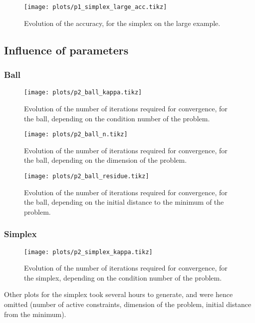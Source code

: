 \documentclass[final]{aomart}
\newtheorem[{}\it]{thm}{Theorem}[section]
\theoremstyle{definition}
\newtheorem*[{}\it]{notation}{Notation}
\numberwithin{equation}{section}
\begin{document}
\begin{figure}[H]
	\centering
	\texttt{[image: plots/p1\_simplex\_large\_acc.tikz]}
	\caption{Evolution of the accuracy, for the simplex on the large example.}
	\label{fig:app_simplex_large_acc}
\end{figure}

\subsection{Influence of parameters}
\subsubsection{Ball}
\begin{figure}[H]
	\centering
	\texttt{[image: plots/p2\_ball\_kappa.tikz]}
	\caption{Evolution of the number of iterations required for convergence, for the ball, depending on the condition number of the problem.}
	\label{fig:p2_ball_kappa}
\end{figure}

\begin{figure}[H]
	\centering
	\texttt{[image: plots/p2\_ball\_n.tikz]}
	\caption{Evolution of the number of iterations required for convergence, for the ball, depending on the dimension of the problem.}
	\label{fig:p2_ball_n}
\end{figure}

\begin{figure}[H]
	\centering
	\texttt{[image: plots/p2\_ball\_residue.tikz]}
	\caption{Evolution of the number of iterations required for convergence, for the ball, depending on the initial distance to the minimum of the problem.}
	\label{fig:p2_ball_residue}
\end{figure}

\subsubsection{Simplex}
\begin{figure}[H]
	\centering
	\texttt{[image: plots/p2\_simplex\_kappa.tikz]}
	\caption{Evolution of the number of iterations required for convergence, for the simplex, depending on the condition number of the problem.}
	\label{fig:p2_simplex_kappa}
\end{figure}

Other plots for the simplex took several hours to generate, and were hence omitted (number of active constraints, dimension of the problem, initial distance from the minimum).
\end{document}
